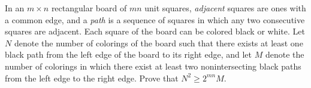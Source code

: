 In an $m \times n$ rectangular board of $mn$ unit squares, \emph{adjacent} squares are ones with a common edge, and a \emph{path} is a sequence of squares in which any two consecutive squares are adjacent. Each square of the board can be colored black or white. Let $N$ denote the number of colorings of the board such that there exists at least one black path from the left edge of the board to its right edge, and let $M$ denote the number of colorings in which there exist at least two nonintersecting black paths from the left edge to the right edge. Prove that $N^2 \geq 2^{mn}M$.
